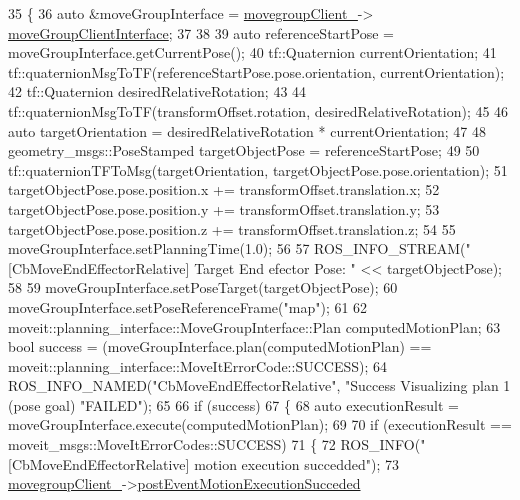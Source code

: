 \begin{DoxyCode}
35 \{
36     \textcolor{keyword}{auto} &moveGroupInterface = \hyperlink{classmoveit__z__client_1_1CbMoveEndEffectorRelative_a5f009b3baaaa47ad3be09d43bab33c07}{movegroupClient\_}->
      \hyperlink{classmoveit__z__client_1_1ClMoveGroup_af86e046b837be0ef4afa9893d8808f20}{moveGroupClientInterface};
37 
38 
39     \textcolor{keyword}{auto} referenceStartPose = moveGroupInterface.getCurrentPose();
40     tf::Quaternion currentOrientation;
41     tf::quaternionMsgToTF(referenceStartPose.pose.orientation, currentOrientation);
42     tf::Quaternion desiredRelativeRotation;
43 
44     tf::quaternionMsgToTF(transformOffset.rotation, desiredRelativeRotation);
45 
46     \textcolor{keyword}{auto} targetOrientation = desiredRelativeRotation * currentOrientation;
47 
48     geometry\_msgs::PoseStamped targetObjectPose = referenceStartPose;
49 
50     tf::quaternionTFToMsg(targetOrientation, targetObjectPose.pose.orientation);
51     targetObjectPose.pose.position.x += transformOffset.translation.x;
52     targetObjectPose.pose.position.y += transformOffset.translation.y;
53     targetObjectPose.pose.position.z += transformOffset.translation.z;
54 
55     moveGroupInterface.setPlanningTime(1.0);
56 
57     ROS\_INFO\_STREAM(\textcolor{stringliteral}{"[CbMoveEndEffectorRelative] Target End efector Pose: "} << targetObjectPose);
58 
59     moveGroupInterface.setPoseTarget(targetObjectPose);
60     moveGroupInterface.setPoseReferenceFrame(\textcolor{stringliteral}{"map"});
61 
62     moveit::planning\_interface::MoveGroupInterface::Plan computedMotionPlan;
63     \textcolor{keywordtype}{bool} success = (moveGroupInterface.plan(computedMotionPlan) == 
      moveit::planning\_interface::MoveItErrorCode::SUCCESS);
64     ROS\_INFO\_NAMED(\textcolor{stringliteral}{"CbMoveEndEffectorRelative"}, \textcolor{stringliteral}{"Success Visualizing plan 1 (pose goal) %
       \textcolor{stringliteral}{"FAILED"});
65 
66     \textcolor{keywordflow}{if} (success)
67     \{
68         \textcolor{keyword}{auto} executionResult = moveGroupInterface.execute(computedMotionPlan);
69 
70         \textcolor{keywordflow}{if} (executionResult == moveit\_msgs::MoveItErrorCodes::SUCCESS)
71         \{
72             ROS\_INFO(\textcolor{stringliteral}{"[CbMoveEndEffectorRelative] motion execution succedded"});
73             \hyperlink{classmoveit__z__client_1_1CbMoveEndEffectorRelative_a5f009b3baaaa47ad3be09d43bab33c07}{movegroupClient\_}->\hyperlink{classmoveit__z__client_1_1ClMoveGroup_ad6b8f0acbe3d11b5c39a83911a3d95b8}{postEventMotionExecutionSucceded}
}
\end{DoxyCode}
